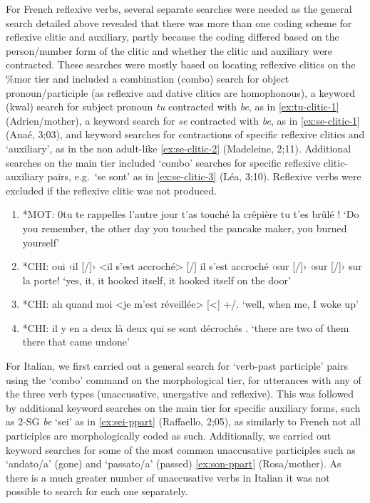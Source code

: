 \documentclass[
  12pt,
]{article}
\begin{document}
For French reflexive verbs, several separate searches were needed as the general search detailed above revealed that there was more than one coding scheme for reflexive clitic and auxiliary, partly because the coding differed based on the person/number form of the clitic and whether the clitic and auxiliary were contracted. These searches were mostly based on locating reflexive clitics on the \%mor tier and included a combination (combo) search for object pronoun/participle (as reflexive and dative clitics are homophonous), a keyword (kwal) search for subject pronoun \emph{tu} contracted with \emph{be}, as in \ref{ex:tu-clitic-1} (Adrien/mother), a keyword search for \emph{se} contracted with \emph{be}, as in \ref{ex:se-clitic-1} (Anaé, 3;03), and keyword searches for contractions of specific reflexive clitics and `auxiliary', as in the non adult-like \ref{ex:se-clitic-2} (Madeleine, 2;11). Additional searches on the main tier included `combo' searches for specific reflexive clitic-auxiliary pairs, e.g.~`se sont' as in \ref{ex:se-clitic-3} (Léa, 3;10). Reflexive verbs were excluded if the reflexive clitic was not produced.

\begin{enumerate}[resume*]
  \item{*MOT:   0tu te rappelles l'autre jour t'as touché la crêpière tu t'es brûlé !\label{ex:tu-clitic-1}} \newline
              `Do you remember, the other day you touched the pancake maker, you burned yourself'
  \item{*CHI:   oui ‹il [/]› <il s'est accroché> [/] il s'est accroché ‹sur [/]› ‹sur [/]› sur la porte!\label{ex:se-clitic-1}} \newline
              `yes, it, it hooked itself, it hooked itself on the door'
  \item{*CHI:   ah quand moi <je m'est réveillée> [<] +/.\label{ex:se-clitic-2}} \newline
              `well, when me, I woke up'  
  \item{*CHI:   il y en a deux là deux qui se sont décrochés .\label{ex:se-clitic-3}} \newline
              `there are two of them there that came undone'  
  \end{enumerate}

For Italian, we first carried out a general search for `verb-past participle' pairs using the `combo' command on the morphological tier, for utterances with any of the three verb types (unaccusative, unergative and reflexive). This was followed by additional keyword searches on the main tier for specific auxiliary forms, such as 2-SG \emph{be} `sei' as in \ref{ex:sei-ppart} (Raffaello, 2;05), as similarly to French not all participles are morphologically coded as such. Additionally, we carried out keyword searches for some of the most common unaccusative participles such as `andato/a' (gone) and `passato/a' (passed) \ref{ex:son-ppart} (Rosa/mother). As there is a much greater number of unaccusative verbs in Italian it was not possible to search for each one separately.
\end{document}
